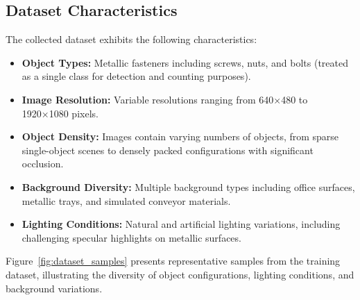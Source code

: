 \subsection{Dataset Characteristics}
The collected dataset exhibits the following characteristics:
\begin{itemize}
    \item \textbf{Object Types:} Metallic fasteners including screws, nuts, and bolts (treated as a single class for detection and counting purposes).
    \item \textbf{Image Resolution:} Variable resolutions ranging from 640×480 to 1920×1080 pixels.
    \item \textbf{Object Density:} Images contain varying numbers of objects, from sparse single-object scenes to densely packed configurations with significant occlusion.
    \item \textbf{Background Diversity:} Multiple background types including office surfaces, metallic trays, and simulated conveyor materials.
    \item \textbf{Lighting Conditions:} Natural and artificial lighting variations, including challenging specular highlights on metallic surfaces.
\end{itemize}

Figure~\ref{fig:dataset_samples} presents representative samples from the training dataset, illustrating the diversity of object configurations, lighting conditions, and background variations.


